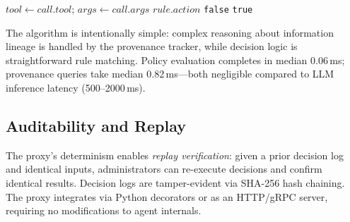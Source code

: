 \begin{algorithm}[t]
\caption{Policy Evaluation Algorithm}
\label{alg:policy}
\begin{algorithmic}[1]
  \State $tool \gets call.tool$; $args \gets call.args$
        \State \Return $rule.action$  
      \EndIf
    \EndIf
  \EndFor
  \State \Return {}
\EndProcedure
{}
      \State \Return \texttt{false}
    \EndIf
  \EndFor
  \State \Return \texttt{true}
\EndProcedure
\end{algorithmic}
\end{algorithm}

The algorithm is intentionally simple: complex reasoning about information lineage is handled by the provenance tracker, while decision logic is straightforward rule matching. Policy evaluation completes in median 0.06\,ms; provenance queries take median 0.82\,ms---both negligible compared to LLM inference latency (500--2000\,ms).

\subsection{Auditability and Replay}

The proxy's determinism enables \emph{replay verification}: given a prior decision log and identical inputs, administrators can re-execute decisions and confirm identical results. Decision logs are tamper-evident via SHA-256 hash chaining. The proxy integrates via Python decorators or as an HTTP/gRPC server, requiring no modifications to agent internals.
